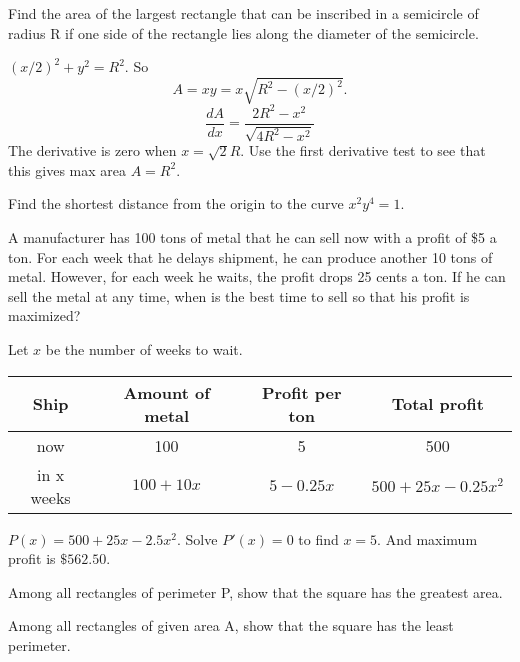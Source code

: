 \documentclass[../calc1-main.tex]{subfiles}
\begin{document}
\begin{example}
  Find the area of the largest rectangle that can be inscribed in a semicircle of radius R if one side of the rectangle lies along the diameter of the semicircle.

\end{example}

\begin{minipage}{0.5\textwidth}
  \begin{solution}
    $(x/2)^2 + y^2 = R^2$. So
    \[
      A = x y = x \sqrt{R^2 - (x/2)^2}.
    \]
    \[
      \frac{dA}{dx} = \frac{2R^2 - x^2}{\sqrt{4R^2-x^2}}
    \]
    The derivative is zero when $x=\sqrt{2}R$. Use the first derivative test to see that this gives max area $A = R^2$.
  \end{solution}
\end{minipage}%
\begin{minipage}{0.5\textwidth}
  \centering
\end{minipage}
\begin{example}
  Find the shortest distance from the origin to the curve $x^2 y^4 = 1$.
\end{example}

\begin{example}
  A manufacturer has 100 tons of metal that he can sell now with a profit of \$5 a ton.  For each week that he delays shipment, he can produce another 10 tons of metal.  However, for each week he waits, the profit drops 25 cents a ton.  If he can sell the metal at any time, when is the best time to sell so that his profit is maximized?
\end{example}
\begin{solution}
  Let $x$ be the number of weeks to wait.
  \begin{table}[H]
    \centering
    \begin{tabular}{|c|c|c|c|}
      \hline
      Ship & Amount of metal & Profit per ton & Total profit \\
      \hline
      now & 100 & 5 & 500 \\
      in x weeks & $100+10x$ & $5-0.25 x$ & $500+25x-0.25 x^2$\\
      \hline
    \end{tabular}
  \end{table}
  $P(x) = 500 + 25x - 2.5x^2$. Solve $P'(x) = 0$ to find $x=5$. And maximum profit is $\$562.50$.
\end{solution}

\begin{example}
  Among all rectangles of perimeter P, show that the square has the greatest area.
\end{example}

\begin{example}
  Among all rectangles of given area A, show that the square has the least perimeter.
\end{example}
\end{document}
